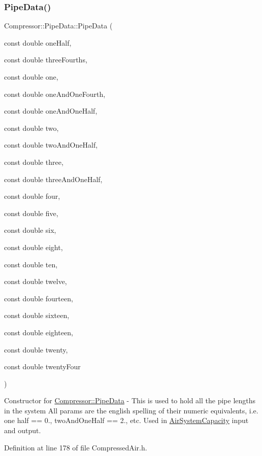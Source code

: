\subsubsection{\texorpdfstring{Pipe\+Data()}{PipeData()}\hspace{0.1cm}{\footnotesize\ttfamily [3/6]}}
{\footnotesize\ttfamily Compressor\+::\+Pipe\+Data\+::\+Pipe\+Data (\begin{DoxyParamCaption}\item[{const double}]{one\+Half,  }\item[{const double}]{three\+Fourths,  }\item[{const double}]{one,  }\item[{const double}]{one\+And\+One\+Fourth,  }\item[{const double}]{one\+And\+One\+Half,  }\item[{const double}]{two,  }\item[{const double}]{two\+And\+One\+Half,  }\item[{const double}]{three,  }\item[{const double}]{three\+And\+One\+Half,  }\item[{const double}]{four,  }\item[{const double}]{five,  }\item[{const double}]{six,  }\item[{const double}]{eight,  }\item[{const double}]{ten,  }\item[{const double}]{twelve,  }\item[{const double}]{fourteen,  }\item[{const double}]{sixteen,  }\item[{const double}]{eighteen,  }\item[{const double}]{twenty,  }\item[{const double}]{twenty\+Four }\end{DoxyParamCaption})\hspace{0.3cm}{\ttfamily [inline]}}

Constructor for \hyperlink{struct_compressor_1_1_pipe_data}{Compressor\+::\+Pipe\+Data} -\/ This is used to hold all the pipe lengths in the system All params are the english spelling of their numeric equivalents, i.\+e. one half == 0., two\+And\+One\+Half == 2., etc. Used in \hyperlink{class_compressor_1_1_air_system_capacity}{Air\+System\+Capacity} input and output. 

Definition at line 178 of file Compressed\+Air.\+h.

